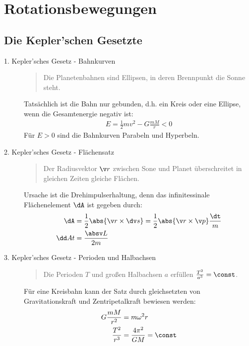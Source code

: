 \documentclass[twocolumn, bfvec]{summery_5.0}
\begin{document}
\section{Rotationsbewegungen}
\subsection{Die Kepler'schen Gesetzte}
\begin{description}
    \item[1. Kepler'sches Gesetz - Bahnkurven]
    \begin{quote}
        Die Planetenbahnen sind Ellipsen, in deren Brennpunkt die Sonne steht.
    \end{quote}
    Tatsächlich ist die Bahn nur gebunden, d.h. ein Kreis oder eine Ellipse, wenn die Gesamtenergie negativ ist:
    \begin{align*}
        E = \frac{1}{2} mv^2 - G \frac{mM}{r}<0
    \end{align*}
    Für \(E>0\) sind die Bahnkurven Parabeln und Hyperbeln.

    \item[2. Kepler'sches Gesetz - Flächensatz]
    \begin{quote}
        Der Radiusvektor \(\v r\) zwischen Sone und Planet überschreitet in gleichen Zeiten gleiche Flächen.
    \end{quote}  
    Ursache ist die Drehimpulserhaltung, denn das infinitessinale Flächenelement \(\dA\) ist gegeben durch: 
    \begin{align*}
        \dA &= \frac12 \abs{\v r \times \dv s}  = \frac12 \abs{\v r \times \v p} \frac\dt m  \\
        \dd At &= \frac{\absv L }{2m} 
    \end{align*}

    \item[3. Kepler'sches Gesetz - Perioden und Halbachsen]
    \begin{quote}
        Die Perioden \(T\) und großen Halbachsen \(a\) erfüllen \(\frac{T^2}{a^3} = \const\).
    \end{quote}
    Für eine Kreisbahn kann der Satz durch gleichsetzten von Gravitationskraft und Zentripetalkraft bewiesen werden:
    \begin{align*}
        G\frac{mM}{r^2} &= m\omega^2 r\\
        \frac{T^2}{r^3} &= \frac{4\pi^2}{GM} = \const
    \end{align*}
\end{description}
\end{document}
